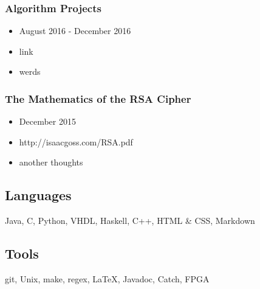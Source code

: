 \documentclass[18pt]{article}
\providecommand{\tightlist}{
    \setlength{\itemsep}{0pt}\setlength{\parskip}{0pt}
}
\begin{document}
\begin{multicols}{2}
      \subsubsection*{Algorithm Projects}
        \begin{itemize}\tightlist
          \item August 2016 - December 2016
          \item link
          \item werds
        \end{itemize}
        
      
      \subsubsection*{The Mathematics of the RSA Cipher}
      \begin{itemize}\tightlist
        \item December 2015
        \item http://isaacgoss.com/RSA.pdf
        \item another thoughts
      \end{itemize}

    \vfill
    \columnbreak
    
        
    \subsection*{Languages}\label{languages}
        Java,
        C,
        Python,
        VHDL,
        Haskell,
        C++,
        HTML \& CSS,
        Markdown
    
    \subsection*{Tools}\label{tools}
        git,
        Unix,
        make,
        regex,
        \LaTeX,
        Javadoc,
        Catch,
        FPGA
    

\end{multicols}
\end{document}
